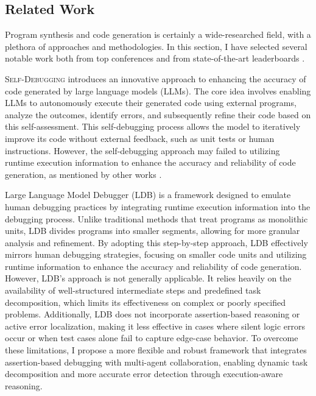 
\subsection{Related Work}


Program synthesis and code generation is certainly a wide-researched field, with a plethora of approaches and methodologies. In this section, I have selected several notable work both from top conferences and from state-of-the-art leaderboards \cite{PaperWithCode}.

\textsc{Self-Debugging} \cite{TeachSelfDebug} introduces an innovative approach to enhancing the accuracy of code generated by large language models (LLMs). The core idea involves enabling LLMs to autonomously execute their generated code using external programs, analyze the outcomes, identify errors, and subsequently refine their code based on this self-assessment. This self-debugging process allows the model to iteratively improve its code without external feedback, such as unit tests or human instructions. However, the self-debugging approach may failed to utilizing runtime execution information to enhance the accuracy and reliability of code generation, as mentioned by other works \cite{LDB}.

Large Language Model Debugger (LDB) \cite{LDB} is a framework designed to emulate human debugging practices by integrating runtime execution information into the debugging process. Unlike traditional methods that treat programs as monolithic units, LDB divides programs into smaller segments, allowing for more granular analysis and refinement. By adopting this step-by-step approach, LDB effectively mirrors human debugging strategies, focusing on smaller code units and utilizing runtime information to enhance the accuracy and reliability of code generation. However, LDB's approach is not generally applicable. It relies heavily on the availability of well-structured intermediate steps and predefined task decomposition, which limits its effectiveness on complex or poorly specified problems. Additionally, LDB does not incorporate assertion-based reasoning or active error localization, making it less effective in cases where silent logic errors occur or when test cases alone fail to capture edge-case behavior. To overcome these limitations, I propose a more flexible and robust framework that integrates assertion-based debugging with multi-agent collaboration, enabling dynamic task decomposition and more accurate error detection through execution-aware reasoning.

